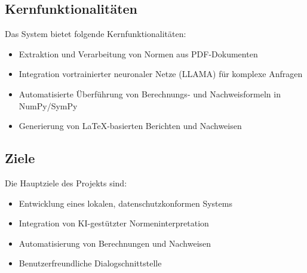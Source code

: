 \subsection{Kernfunktionalitäten}
Das System bietet folgende Kernfunktionalitäten:
\begin{itemize}
    \item Extraktion und Verarbeitung von Normen aus PDF-Dokumenten
    \item Integration vortrainierter neuronaler Netze (LLAMA) für komplexe Anfragen
    \item Automatisierte Überführung von Berechnungs- und Nachweisformeln in NumPy/SymPy
    \item Generierung von LaTeX-basierten Berichten und Nachweisen
\end{itemize}

\subsection{Ziele}
Die Hauptziele des Projekts sind:
\begin{itemize}
    \item Entwicklung eines lokalen, datenschutzkonformen Systems
    \item Integration von KI-gestützter Normeninterpretation
    \item Automatisierung von Berechnungen und Nachweisen
    \item Benutzerfreundliche Dialogschnittstelle
\end{itemize}
